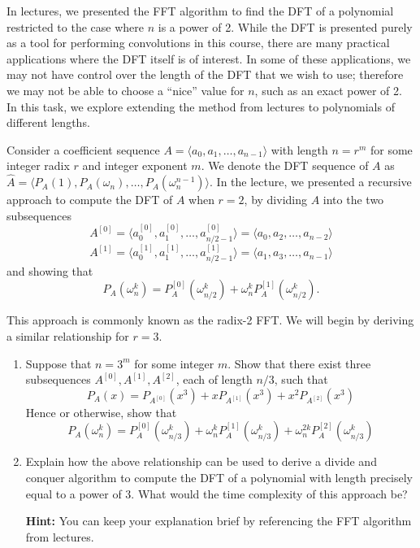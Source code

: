 \documentclass[12pt]{article}
\begin{document}

\begin{question}
In lectures, we presented the FFT algorithm to find the DFT of a polynomial restricted to the case where $n$ is a power of 2. While the DFT is presented purely as a tool for performing convolutions in this course, there are many practical applications where the DFT itself is of interest. In some of these applications, we may not have control over the length of the DFT that we wish to use; therefore we may not be able to choose a ``nice'' value for $n$, such as an exact power of 2. In this task, we explore extending the method from lectures to polynomials of different lengths.

Consider a coefficient sequence $A = \langle a_0, a_1, \dots, a_{n-1} \rangle$ with length $n = r^m$ for some integer radix $r$ and integer exponent $m$. We denote the DFT sequence of $A$ as $\hat{A} = \langle P_A(1), P_A(\omega_n), \dots, P_A(\omega_n^{n-1}) \rangle$. In the lecture, we presented a recursive approach to compute the DFT of $A$ when $r = 2$, by dividing $A$ into the two subsequences
\[ A^{[0]} = \langle a^{[0]}_0, a^{[0]}_1, \dots, a^{[0]}_{n/2-1} \rangle = \langle a_0, a_2, \dots, a_{n-2} \rangle \] 
\[A^{[1]} = \langle a^{[1]}_0, a^{[1]}_1, \dots, a^{[1]}_{n/2-1} \rangle = \langle a_1, a_3, \dots, a_{n-1} \rangle \]
and showing that
\[ P_A(\omega_n^k) = P_A^{[0]}(\omega^k_{n/2}) + \omega^k_n P_A^{[1]}(\omega^k_{n/2}). \]

This approach is commonly known as the radix-2 FFT. We will begin by deriving a similar relationship for $r = 3$.

\begin{enumerate}
    \item Suppose that $n = 3^m$ for some integer $m$. Show that there exist three subsequences $A^{[0]}, A^{[1]}, A^{[2]}$, each of length $n/3$, such that 
    \[ P_A(x) = P_{A^{[0]}}(x^3) + xP_{A^{[1]}}(x^3) + x^2P_{A^{[2]}}(x^3) \] Hence or otherwise, show that
    \[ P_A(\omega_n^k) = P_A^{[0]}(\omega^k_{n/3}) + \omega^k_n P_A^{[1]}(\omega^k_{n/3}) + \omega^{2k}_n P_A^{[2]}(\omega^k_{n/3})\]
    
    \item Explain how the above relationship can be used to derive a divide and conquer algorithm to compute the DFT of a polynomial with length precisely equal to a power of 3. What would the time complexity of this approach be?

    {\textbf{Hint:}} You can keep your explanation brief by referencing the FFT algorithm from lectures.  
    

\end{enumerate}
\end{question}
\end{document}
